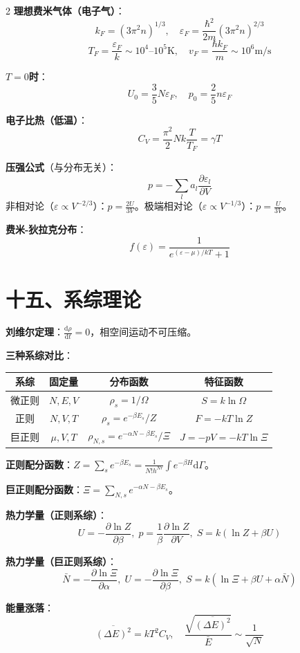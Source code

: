 \documentclass[10pt,a4paper,fontset=mac]{ctexart}
\newcommand{\dd}{\mathrm{d}}
\newcommand{\đ}{\mathrm{đ}}
\begin{document}
\begin{multicols}{2}
\textbf{理想费米气体（电子气）}：
\[
\boxed{k_F=(3\pi^2n)^{1/3}},\quad
\boxed{\varepsilon_F=\frac{\hbar^2}{2m}(3\pi^2n)^{2/3}}
\]
\[
T_F=\frac{\varepsilon_F}{k}\sim10^4\text{--}10^5\text{K},\quad
v_F=\frac{\hbar k_F}{m}\sim10^6\text{m/s}
\]

\textbf{$T=0$时}：
\[
\boxed{U_0=\frac{3}{5}N\varepsilon_F},\quad
\boxed{p_0=\frac{2}{5}n\varepsilon_F}
\]

\textbf{电子比热（低温）}：
\[
\boxed{C_V=\frac{\pi^2}{2}Nk\frac{T}{T_F}=\gamma T}
\]

\textbf{压强公式}（与分布无关）：
\[
p=-\sum_la_l\frac{\partial\varepsilon_l}{\partial V}
\]
非相对论（$\varepsilon\propto V^{-2/3}$）：$\boxed{p=\frac{2U}{3V}}$。极端相对论（$\varepsilon\propto V^{-1/3}$）：$p=\frac{U}{3V}$。

\textbf{费米-狄拉克分布}：
\[
\boxed{f(\varepsilon)=\frac{1}{e^{(\varepsilon-\mu)/kT}+1}}
\]

\section*{十五、系综理论}

\textbf{刘维尔定理}：$\frac{\dd\rho}{\dd t}=0$，相空间运动不可压缩。

\textbf{三种系综对比}：

\begin{tabular}{c|c|c|c}
系综 & 固定量 & 分布函数 & 特征函数 \\
\hline
微正则 & $N,E,V$ & $\rho_s=1/\Omega$ & $S=k\ln\Omega$ \\
正则 & $N,V,T$ & $\rho_s=e^{-\beta E_s}/Z$ & $F=-kT\ln Z$ \\
巨正则 & $\mu,V,T$ & $\rho_{N,s}=e^{-\alpha N-\beta E_s}/\Xi$ & $J=-pV=-kT\ln\Xi$ \\
\end{tabular}

\textbf{正则配分函数}：$Z=\sum_se^{-\beta E_s}=\frac{1}{N!h^{Nr}}\!\int\!e^{-\beta H}\dd\Gamma$。

\textbf{巨正则配分函数}：$\Xi=\sum_{N,s}e^{-\alpha N-\beta E_s}$。

\textbf{热力学量（正则系综）}：
\[
U=-\frac{\partial\ln Z}{\partial\beta},\;
p=\frac{1}{\beta}\frac{\partial\ln Z}{\partial V},\;
S=k(\ln Z+\beta U)
\]

\textbf{热力学量（巨正则系综）}：
\[
\bar{N}=-\frac{\partial\ln\Xi}{\partial\alpha},\;
U=-\frac{\partial\ln\Xi}{\partial\beta},\;
S=k(\ln\Xi+\beta U+\alpha\bar{N})
\]

\textbf{能量涨落}：
\[
\boxed{\overline{(\Delta E)^2}=kT^2C_V},\quad
\frac{\sqrt{\overline{(\Delta E)^2}}}{\bar{E}}\sim\frac{1}{\sqrt{N}}
\]


\end{multicols}
\end{document}

